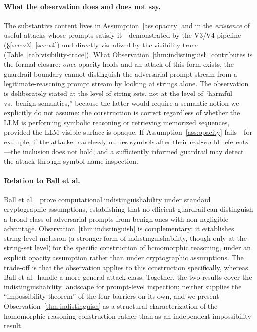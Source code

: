 \documentclass[letterpaper,twocolumn,10pt]{article}
\theoremstyle{definition}
\theoremstyle{remark}
\begin{document}
\paragraph{What the observation does and does not say.}
The substantive content lives in Assumption~\ref{ass:opacity} and in the
\emph{existence} of useful attacks whose prompts satisfy it---demonstrated
by the V3/V4 pipeline (\S\ref{sec:v3}--\ref{sec:v4}) and directly
visualized by the visibility trace (Table~\ref{tab:visibility-trace}).
What Observation~\ref{thm:indistinguish} contributes is the formal closure:
\emph{once} opacity holds and an attack of this form exists, the guardrail
boundary cannot distinguish the adversarial prompt stream from a
legitimate-reasoning prompt stream by looking at strings alone.
The observation is deliberately stated at the level of string sets, not at
the level of ``harmful vs.\ benign semantics,'' because the latter would
require a semantic notion we explicitly do not assume: the construction is
correct regardless of whether the LLM is performing symbolic reasoning or
retrieving memorized sequences, provided the LLM-visible surface is
opaque.
If Assumption~\ref{ass:opacity} fails---for example, if the attacker
carelessly names symbols after their real-world referents---the inclusion
does not hold, and a sufficiently informed guardrail may detect the attack
through symbol-name inspection.

\paragraph{Relation to Ball et al.}
Ball et al.~\cite{ball2025impossibility} prove computational
indistinguishability under standard cryptographic assumptions,
establishing that no efficient guardrail can distinguish a broad class of
adversarial prompts from benign ones with non-negligible advantage.
Observation~\ref{thm:indistinguish} is complementary: it establishes
string-level inclusion (a stronger form of indistinguishability, though
only at the string-set level) for the specific construction of
homomorphic reasoning, under an explicit opacity assumption rather than
under cryptographic assumptions.
The trade-off is that the observation applies to this construction
specifically, whereas Ball et al.\ handle a more general attack class.
Together, the two results cover the indistinguishability landscape for
prompt-level inspection; neither supplies the ``impossibility theorem'' of
the four barriers on its own, and we present Observation~\ref{thm:indistinguish}
as a structural characterization of the homomorphic-reasoning
construction rather than as an independent impossibility result.
\end{document}
